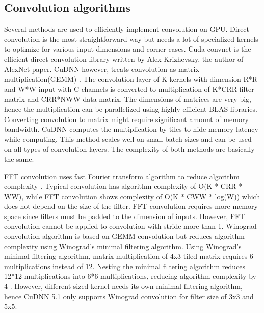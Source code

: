 \subsection{Convolution algorithms}
Several methods are used to efficiently implement convolution on GPU.
Direct convolution is the most straightforward way but needs a lot of specialized kernels to optimize for various input dimensions and corner cases.
Cuda-convnet \cite{cuda-convnet} is the efficient direct convolution library written by Alex Krizhevsky, the author of AlexNet paper.
CuDNN however, treats convolution as matrix multiplication(GEMM) \cite{cudnn}.
The convolution layer of K kernels with dimension R*R and W*W input with C channels is converted to multiplication of K*CRR filter matrix and CRR*NWW data matrix.
The dimensions of matrices are very big, hence the multiplication can be parallelized using highly efficient BLAS libraries.
Converting convolution to matrix might require significant amount of memory bandwidth.
CuDNN computes the multiplication by tiles to hide memory latency while computing.
This method scales well on small batch sizes and can be used on all types of convolution layers.
The complexity of both methods are basically the same.

FFT convolution uses fast Fourier transform algorithm to reduce algorithm complexity \cite{fftconv}.
Typical convolution has algorithm complexity of O(K * CRR * WW), while FFT convolution shows complexity of O(K * CWW * log(W)) which does not depend on the size of the filter.
FFT convolution requires more memory space since filters must be padded to the dimension of inputs.
However, FFT convolution cannot be applied to convolution with stride more than 1.
Winograd convolution algorithm is based on GEMM convolution but reduces algorithm complexity using Winograd's minimal filtering algorithm.
Using Winograd’s minimal filtering algorithm, matrix multiplication of 4x3 tiled matrix requires 6 multiplications instead of 12.
Nesting the minimal filtering algorithm reduces 12*12 multiplications into 6*6 multiplications, reducing algorithm complexity by 4 \cite{winograd}.
However, different sized kernel needs its own minimal filtering algorithm, hence CuDNN 5.1 only supports Winograd convolution for filter size of 3x3 and 5x5.

